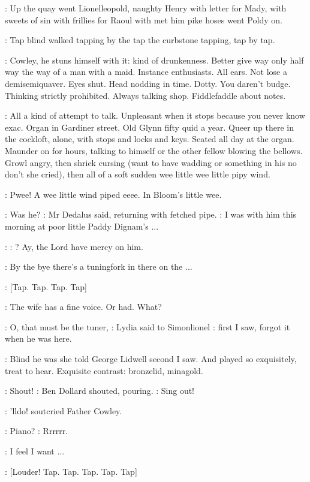 :
Up the quay went Lionelleopold, naughty Henry with letter for
Mady, with sweets of sin with frillies for Raoul with met him pike hoses
went Poldy on.

:
Tap blind walked
tapping by the tap the curbstone tapping,
tap by tap.

\BloomInt:
Cowley, he stuns himself with it: kind of drunkenness. Better give
way only half way the way of a man with a maid. Instance enthusiasts. All
ears. Not lose a demisemiquaver. Eyes shut. Head nodding in time. Dotty.
You daren't budge. Thinking strictly prohibited. Always talking shop.
Fiddlefaddle about notes.

\BloomInt:
All a kind of attempt to talk. Unpleasant when it stops because you
never know exac. Organ in Gardiner street. Old Glynn fifty quid a year.
Queer up there in the cockloft, alone, with stops and locks and keys.
Seated all day at the organ. Maunder on for hours, talking to himself or
the other fellow blowing the bellows.
Growl angry, then shriek cursing
(want to have wadding or something in his no don't she cried), then all of
a soft sudden wee little wee little pipy wind.

:
Pwee! A wee little wind piped eeee. In Bloom's little wee.

\Simon:
Was he?
:
Mr Dedalus said, returning with fetched pipe.
\Simon:
I was with him this morning at poor little Paddy Dignam's ...

\Cowley:
 \Stage:
?
Ay, the Lord have mercy on him.

\Simon:
By the bye there's a tuningfork in there on the ...

\Stripling:
[Tap. Tap. Tap. Tap]

\Lidwell:
The wife has a fine voice. Or had. What?

\MissD:
O, that must be the tuner,
:
Lydia said to Simonlionel
\MissD:
first I saw, forgot
it when he was here.

:
Blind he was she told George Lidwell second I saw. And played so
exquisitely, treat to hear. Exquisite contrast: bronzelid, minagold.

\Dollard:
Shout!
:
Ben Dollard shouted, pouring.
\Dollard:
Sing out!

\Cowley:
'lldo!
sout{cried Father Cowley.}

\Stage:
Piano?
:
Rrrrrr.

\BloomInt:
I feel I want ...

\Stripling:
[Louder! Tap. Tap. Tap. Tap. Tap]

